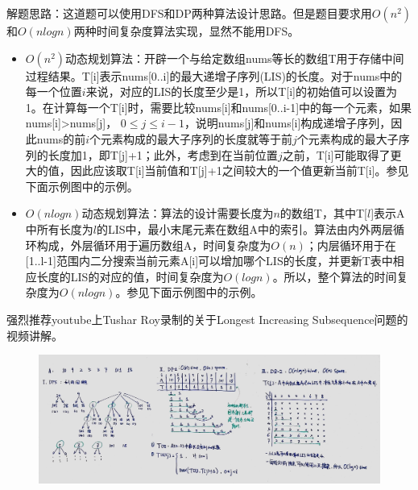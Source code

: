 \documentclass[a4paper,10pt]{article}
\begin{document}
\begin{CJK*}{UTF8}{gbsn}
\noindent 解题思路：这道题可以使用DFS和DP两种算法设计思路。但是题目要求用$O(n^2)$和$O(nlogn)$两种时间复杂度算法实现，显然不能用DFS。
\begin{itemize}
    \item $O(n^2)$动态规划算法：开辟一个与给定数组nums等长的数组T用于存储中间过程结果。T[i]表示nums[0..i]的最大递增子序列(LIS)的长度。对于nums中的每一个位置$i$来说，对应的LIS的长度至少是1，所以T[i]的初始值可以设置为1。在计算每一个T[i]时，需要比较nums[i]和nums[0..i-1]中的每一个元素，如果nums[i]>nums[j]， $0 \leq j \leq i-1$，说明nums[j]和nums[i]构成递增子序列，因此nums的前$i$个元素构成的最大子序列的长度就等于前$j$个元素构成的最大子序列的长度加1，即T[j]+1；此外，考虑到在当前位置$j$之前，T[i]可能取得了更大的值，因此应该取T[i]当前值和T[j]+1之间较大的一个值更新当前T[i]。参见下面示例图中的示例。
    
    \item $O(nlogn)$动态规划算法：算法的设计需要长度为$n$的数组T，其中T[$l$]表示A中所有长度为$l$的LIS中，最小末尾元素在数组A中的索引。算法由内外两层循环构成，外层循环用于遍历数组A，时间复杂度为$O(n)$；内层循环用于在[1..l-1]范围内二分搜索当前元素A[i]可以增加哪个LIS的长度，并更新T表中相应长度的LIS的对应的值，时间复杂度为$O(logn)$。所以，整个算法的时间复杂度为$O(nlogn)$。参见下面示例图中的示例。
\end{itemize}
\noindent 强烈推荐youtube上Tushar Roy录制的关于Longest Increasing Subsequence问题的视频讲解。
\end{CJK*}

\begin{figure}[h]
    \includegraphics[width=\textwidth]{leetcode300.jpg}
    \centering\\
\end{figure}
\end{document}
